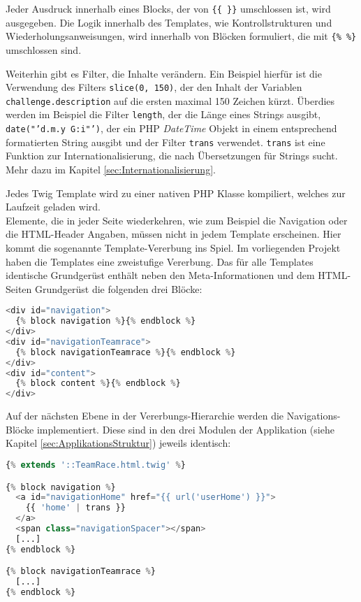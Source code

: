 \documentclass[12pt]{report}
\begin{document}
Jeder Ausdruck innerhalb eines Blocks, der von \texttt{\{\{ \}\}} umschlossen ist, wird ausgegeben. Die Logik innerhalb des Templates, wie Kontrollstrukturen und Wiederholungsanweisungen, wird innerhalb von Blöcken formuliert, die mit \texttt{\{\% \%\}} umschlossen sind.

Weiterhin gibt es Filter, die Inhalte verändern. Ein Beispiel hierfür ist die Verwendung des Filters \texttt{slice(0, 150)}, der den Inhalt der Variablen \texttt{challenge.description} auf die ersten maximal 150 Zeichen kürzt. Überdies werden im Beispiel die Filter \texttt{length}, der die Länge eines Strings ausgibt, \texttt{date("'d.m.y G:i"')}, der ein PHP \emph{DateTime} Objekt in einem entsprechend formatierten String ausgibt und der Filter \texttt{trans} verwendet. \texttt{trans} ist eine Funktion zur Internationalisierung, die nach Übersetzungen für Strings sucht. Mehr dazu im Kapitel \ref{sec:Internationalisierung}.

Jedes Twig Template wird zu einer nativen PHP Klasse kompiliert, welches zur Laufzeit geladen wird.\\

Elemente, die in jeder Seite wiederkehren, wie zum Beispiel die Navigation oder die HTML-Header Angaben, müssen nicht in jedem Template erscheinen. Hier kommt die sogenannte Template-Vererbung ins Spiel. Im vorliegenden Projekt haben die Templates eine zweistufige Vererbung. Das für alle Templates identische Grundgerüst enthält neben den Meta-Informationen und dem HTML-Seiten Grundgerüst die folgenden drei Blöcke:
\begin{lstlisting}[language=PHP, caption=Auszug aus app/Resources/views/TeamRace.html.twig]
<div id="navigation">
  {% block navigation %}{% endblock %}
</div>
<div id="navigationTeamrace">
  {% block navigationTeamrace %}{% endblock %}
</div>
<div id="content">
  {% block content %}{% endblock %}
</div>
\end{lstlisting}

Auf der nächsten Ebene in der Vererbungs-Hierarchie werden die Navigations-Blöcke implementiert. Diese sind in den drei Modulen der Applikation (siehe Kapitel \ref{sec:ApplikationsStruktur}) jeweils identisch: 
\begin{lstlisting}[language=PHP, caption=Auszug aus \\src/TeamRace/WebBundle/Resources/views/Teamrace/\_layout.html.twig]
{% extends '::TeamRace.html.twig' %}

{% block navigation %}
  <a id="navigationHome" href="{{ url('userHome') }}">
    {{ 'home' | trans }}
  </a>
  <span class="navigationSpacer"></span>
  [...]
{% endblock %}

{% block navigationTeamrace %}
  [...]
{% endblock %}
\end{lstlisting}
\end{document}
